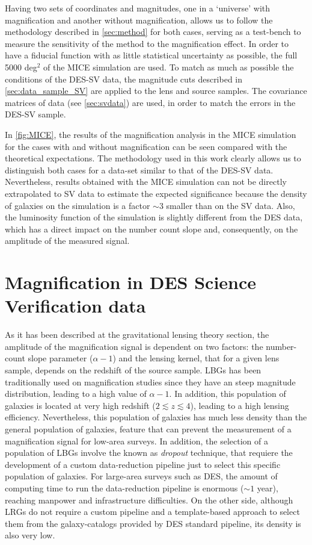 Having two sets of coordinates and magnitudes, one in a `universe' with magnification and another without magnification, allows us to follow the methodology described in \autoref{sec:method} for both cases,
serving as a test-bench to measure the sensitivity of the method to the magnification effect. In order to have a fiducial function with as little statistical uncertainty as possible, the full 5000 deg$^2$ of the MICE simulation are used. To match as much as possible the conditions of the DES-SV data, the magnitude cuts described in \autoref{sec:data_sample_SV} are applied to the lens and source samples. The covariance matrices of data (see \autoref{sec:svdata}) are used, in order to match the errors in the DES-SV sample.

In \autoref{fig:MICE}, the results of the magnification analysis in the MICE simulation for the cases with and without magnification can be seen compared with the theoretical expectations. The methodology used in this work clearly allows us to distinguish both cases for a data-set similar to that of the DES-SV data. Nevertheless, results obtained with the MICE simulation can not be directly extrapolated to SV data to estimate the expected significance because the density of galaxies on the simulation is a factor $\sim3$ smaller than on the SV data. Also, the luminosity function of the simulation is slightly different from the DES data, which has a direct impact on the number count slope and, consequently, on the amplitude of the measured signal.


\section{Magnification in DES Science Verification data}
\label{sec:svdata}
As it has been described at the gravitational lensing theory section, the amplitude of the magnification signal is dependent on two factors: the number-count slope parameter ($\alpha-1$) and the lensing kernel, that for a given lens sample, depends on the redshift of the source sample. LBGs has been traditionally used on magnification studies since they have an steep magnitude distribution, leading to a high value of $\alpha-1$. In addition, this population of galaxies is located at very high redshift ($2\lesssim z\lesssim 4$), leading to a high lensing efficiency. Nevertheless, this population of galaxies has much less density than the general population of galaxies, feature that can prevent the measurement of a magnification signal for low-area surveys. In addition, the selection of a population of LBGs involve the known as {\it dropout} technique, that requiere the development of a custom data-reduction pipeline just to select this specific population of galaxies. For large-area surveys such as DES, the amount of computing time to run the data-reduction pipeline is enormous ($\sim 1$ year), reaching manpower and infrastructure difficulties. On the other side, although LRGs do not require a custom pipeline and a template-based approach to select them from the galaxy-catalogs provided by DES standard pipeline, its density is also very low.
\newline

